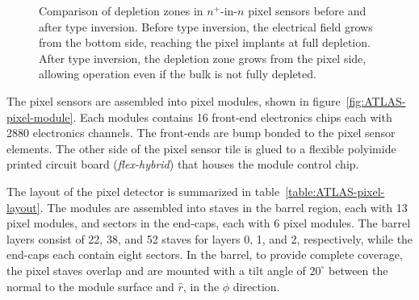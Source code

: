  \begin{figure}[htbp]
 	\centering
 	\hfill
 	\caption{Comparison of depletion zones in $n^+$-in-$n$ pixel sensors before and after type inversion. Before type inversion, the electrical field grows from the bottom side, reaching the pixel implants at full depletion. After type inversion, the depletion zone grows from the pixel side, allowing operation even if the bulk is not fully depleted.}
 	\label{fig:ATLAS-pixel}
 \end{figure}
 

The pixel sensors are assembled into pixel modules, shown in figure~\ref{fig:ATLAS-pixel-module}. Each modules contains 16 front-end electronics chips each with 2880 electronics channels. The front-ends are bump bonded to the pixel sensor elements. The other side of the pixel sensor tile is glued to a flexible polyimide printed circuit board (\emph{flex-hybrid}) that houses the module control chip.

The layout of the pixel detector is summarized in table~\ref{table:ATLAS-pixel-layout}.  The modules are assembled into staves in the barrel region, each with 13 pixel modules, and sectors in the end-caps, each with 6 pixel modules. The barrel layers consist of 22, 38, and 52 staves for layers 0, 1, and 2, respectively, while the end-caps each contain eight sectors. In the barrel, to provide complete coverage, the pixel staves overlap and are mounted with a tilt angle of $20^{\circ}$ between the normal to the module surface and $\hat{r}$, in the $\hat{\phi}$ direction. 

